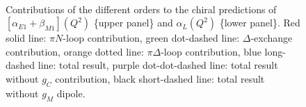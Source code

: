 \documentclass[12pt,preprint,tightenlines,
showpacs,preprintnumbers,amsmath,amssymb,
a4paper,nofootinbib]{revtex4-1}
\begin{document}

\begin{figure}
\begin{center}
 \\ \vspace{0.5cm}
\caption{\small{Contributions of the different orders to the chiral predictions of $[\alpha_{E1}+\beta_{M1}](Q^2)$ \{upper panel\} and $\alpha_L(Q^2)$ \{lower panel\}. Red solid line: $\pi N$-loop contribution, green dot-dashed line: $\Delta$-exchange contribution, orange dotted line: $\pi \Delta$-loop contribution, blue long-dashed line: total result, purple dot-dot-dashed line: total result without $g_C$ contribution, black short-dashed line: total result without $g_M$ dipole.}\label{Fig:alpha+beta-orders}}
\end{center}
\end{figure}
\end{document}
